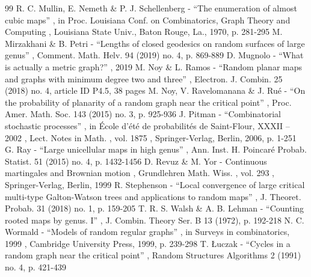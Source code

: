 \documentclass[11pt]{article}
\theoremstyle{plain}
\theoremstyle{definition}
\theoremstyle{remark}
\begin{document}
\begin{thebibliography}{99}
 R. C. Mullin, E. Nemeth \& P. J. Schellenberg - “The enumeration of almost cubic maps” , in Proc. Louisiana Conf. on Combinatorics, Graph Theory and Computing , Louisiana State Univ., Baton Rouge, La., 1970, p. 281-295
 M. Mirzakhani \& B. Petri - “Lengths of closed geodesics on random surfaces of large genus” , Comment. Math. Helv. 94 (2019) no. 4, p. 869-889
 D. Mugnolo - “What is actually a metric graph?” , 2019
 M. Noy \& L. Ramos - “Random planar maps and graphs with minimum degree two and three” , Electron. J. Combin. 25 (2018) no. 4, article ID P4.5, 38 pages
 M. Noy, V. Ravelomanana \& J. Rué - “On the probability of planarity of a random graph near the critical point” , Proc. Amer. Math. Soc. 143 (2015) no. 3, p. 925-936
 J. Pitman - “Combinatorial stochastic processes” , in École d’été de probabilités de Saint-Flour, XXXII – 2002 , Lect. Notes in Math. , vol. 1875 , Springer-Verlag, Berlin, 2006, p. 1-251
 G. Ray - “Large unicellular maps in high genus” , Ann. Inst. H. Poincaré Probab. Statist. 51 (2015) no. 4, p. 1432-1456
 D. Revuz \& M. Yor - Continuous martingales and Brownian motion , Grundlehren Math. Wiss. , vol. 293 , Springer-Verlag, Berlin, 1999
 R. Stephenson - “Local convergence of large critical multi-type Galton-Watson trees and applications to random maps” , J. Theoret. Probab. 31 (2018) no. 1, p. 159-205
 T. R. S. Walsh \& A. B. Lehman - “Counting rooted maps by genus. I” , J. Combin. Theory Ser. B 13 (1972), p. 192-218
 N. C. Wormald - “Models of random regular graphs” , in Surveys in combinatorics, 1999 , Cambridge University Press, 1999, p. 239-298
 T. Łuczak - “Cycles in a random graph near the critical point” , Random Structures Algorithms 2 (1991) no. 4, p. 421-439
\end{thebibliography}
\end{document}
